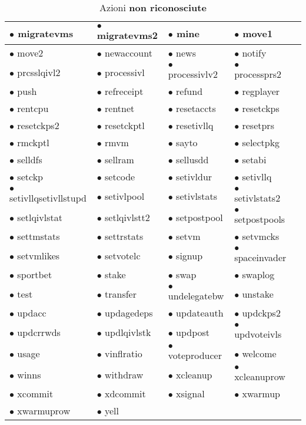 \begin{table}[h!]
\begin{adjustbox}{width=0.6\textwidth}
\begin{tabular}{|l|l|l|l|l|}
\hline
$\bullet$ migratevms & $\bullet$ migratevms2 & $\bullet$ mine & $\bullet$ move1 \\
\hline
$\bullet$ move2 & $\bullet$ newaccount & $\bullet$ news & $\bullet$ notify \\
\hline
$\bullet$ prcsslqivl2 & $\bullet$ processivl & $\bullet$ processivlv2 & $\bullet$ processprs2 \\
\hline
$\bullet$ push & $\bullet$ refreceipt & $\bullet$ refund & $\bullet$ regplayer \\
\hline
$\bullet$ rentcpu & $\bullet$ rentnet & $\bullet$ resetaccts & $\bullet$ resetckps \\
\hline
$\bullet$ resetckps2 & $\bullet$ resetckptl & $\bullet$ resetivllq & $\bullet$ resetprs \\
\hline
$\bullet$ rmckptl & $\bullet$ rmvm & $\bullet$ sayto & $\bullet$ selectpkg \\
\hline
$\bullet$ selldfs & $\bullet$ sellram & $\bullet$ sellusdd & $\bullet$ setabi \\
\hline
$\bullet$ setckp & $\bullet$ setcode & $\bullet$ setivldur & $\bullet$ setivllq \\
\hline
$\bullet$ setivllqsetivllstupd & $\bullet$ setivlpool & $\bullet$ setivlstats & $\bullet$ setivlstats2 \\
\hline
$\bullet$ setlqivlstat & $\bullet$ setlqivlstt2 & $\bullet$ setpostpool & $\bullet$ setpostpools \\
\hline
$\bullet$ settmstats & $\bullet$ settrstats & $\bullet$ setvm & $\bullet$ setvmcks \\
\hline
$\bullet$ setvmlikes & $\bullet$ setvotelc & $\bullet$ signup & $\bullet$ spaceinvader \\
\hline
$\bullet$ sportbet & $\bullet$ stake & $\bullet$ swap & $\bullet$ swaplog \\
\hline
$\bullet$ test & $\bullet$ transfer & $\bullet$ undelegatebw & $\bullet$ unstake \\
\hline
$\bullet$ updacc & $\bullet$ updagedeps & $\bullet$ updateauth & $\bullet$ updckps2 \\
\hline
$\bullet$ updcrrwds & $\bullet$ updlqivlstk & $\bullet$ updpost & $\bullet$ updvoteivls \\
\hline
$\bullet$ usage & $\bullet$ vinflratio & $\bullet$ voteproducer & $\bullet$ welcome \\
\hline
$\bullet$ winns & $\bullet$ withdraw & $\bullet$ xcleanup & $\bullet$ xcleanuprow \\
\hline
$\bullet$ xcommit & $\bullet$ xdcommit & $\bullet$ xsignal & $\bullet$ xwarmup \\
\hline
$\bullet$ xwarmuprow & $\bullet$ yell \\
\cline{1-2}
\end{tabular}
\end{adjustbox}
\caption{Azioni \textbf{non riconosciute}}
\label{tab: appendix_actions}
\end{table}
